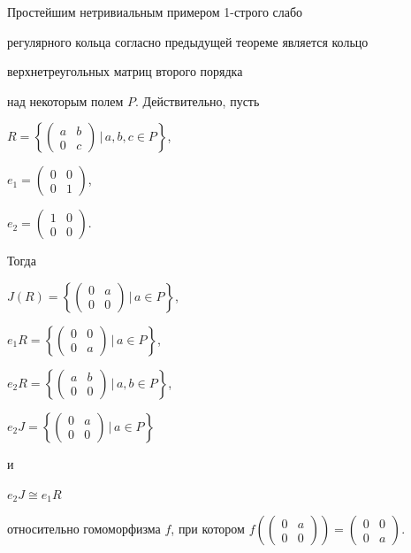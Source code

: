 \begin{examnonum} 


Простейшим нетривиальным примером 1-строго слабо  


регулярного кольца согласно предыдущей теореме является кольцо  


верхнетреугольных матриц второго порядка


над некоторым полем $P$. Действительно, пусть 


$R=\left\{\left(\begin{smallmatrix}a & b \\ 0 & c \end{smallmatrix} 


\right)\, \Big|\,a,b,c\in P\right\}$, 


$e_1=\left (\begin{smallmatrix}0 & 0 \\ 0 & 1 \end{smallmatrix} \right)$, 


$e_2=\left(\begin{smallmatrix}1 & 0 \\ 0 & 0 \end{smallmatrix} \right)$. 


Тогда 


$J(R)=\left\{\left(\begin{smallmatrix}0 & a \\ 0 & 0 \end{smallmatrix} 


\right)\, \Big|\,a\in P\right\}$, 


$e_1R=\left\{\left(\begin{smallmatrix}0 & 0 \\ 0 & a \end{smallmatrix} 


\right)\, \Big|\,a\in P\right\}$, 


$e_2R=\left\{\left(\begin{smallmatrix}a & b \\ 0 & 0 \end{smallmatrix} 


\right)\, \Big|\,a,b\in P\right\}$, 


$e_2J=\left\{\left(\begin{smallmatrix}0 & a \\ 0 & 0 \end{smallmatrix} 


\right)\, \Big|\,a\in P\right\}$ 


и 


$e_2J\cong e_1R$ 


относительно гомоморфизма $f$, при котором $f\left(\left( 


\begin{smallmatrix} 0 & a \\ 0 & 0 \end{smallmatrix}\right)\right)= 


\left(\begin{smallmatrix}0 & 0 \\ 0 & a\end{smallmatrix}\right)$. 


\end{examnonum} 



